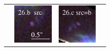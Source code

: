 \documentclass[useAMS,usenatbib]{mn2e}
\begin{document}
\begin{table}
\begin{tabular}{cccc}
    & \multicolumn{1}{m{1.7cm}}{\includegraphics[height=2.00cm,clip]{figs/enfw_img/rgb.src_26_b.ps}}
    & \multicolumn{1}{m{1.7cm}}{\includegraphics[height=2.00cm,clip]{figs/enfw_img/rgb.pre_26_c_b_tri.ps}} \\
  \end{tabular}

\end{table}
\end{document}
